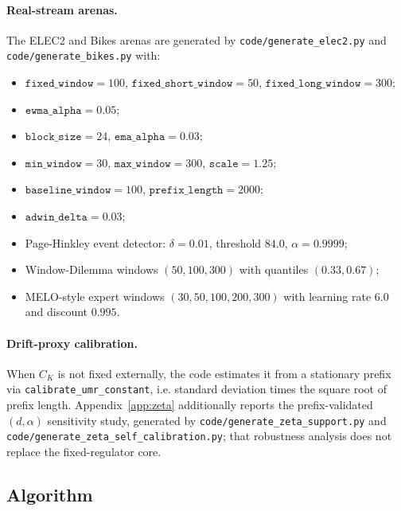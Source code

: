 \paragraph{Real-stream arenas.}
The ELEC2 and Bikes arenas are generated by
\texttt{code/generate\_elec2.py} and \texttt{code/generate\_bikes.py} with:
\begin{itemize}
  \item $\texttt{fixed\_window}=100$, $\texttt{fixed\_short\_window}=50$,
  $\texttt{fixed\_long\_window}=300$;
  \item $\texttt{ewma\_alpha}=0.05$;
  \item $\texttt{block\_size}=24$, $\texttt{ema\_alpha}=0.03$;
  \item $\texttt{min\_window}=30$, $\texttt{max\_window}=300$,
  $\texttt{scale}=1.25$;
  \item $\texttt{baseline\_window}=100$, $\texttt{prefix\_length}=2000$;
  \item $\texttt{adwin\_delta}=0.03$;
  \item Page-Hinkley event detector: $\delta=0.01$, threshold $84.0$,
  $\alpha=0.9999$;
  \item Window-Dilemma windows $(50,100,300)$ with quantiles $(0.33,0.67)$;
  \item MELO-style expert windows $(30,50,100,200,300)$ with learning rate $6.0$
  and discount $0.995$.
\end{itemize}

\paragraph{Drift-proxy calibration.}
When $C_K$ is not fixed externally, the code estimates it from a stationary
prefix via \texttt{calibrate\_umr\_constant}, i.e. standard deviation times the
square root of prefix length. Appendix~\ref{app:zeta} additionally reports the
prefix-validated $(d,\alpha)$ sensitivity study, generated by
\texttt{code/generate\_zeta\_support.py} and
\texttt{code/generate\_zeta\_self\_calibration.py}; that robustness analysis
does not replace the fixed-regulator core.

\subsection{Algorithm}

